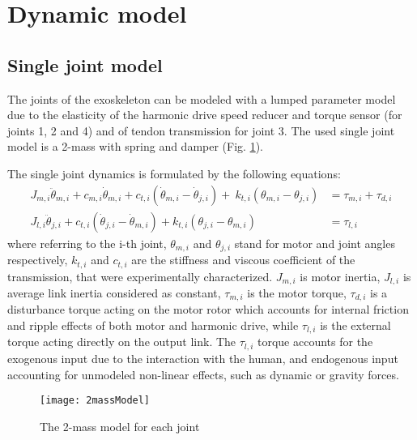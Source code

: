 \section{Dynamic model} \label{sec:dynamic_model}

\subsection{Single joint model} \label{Single joint model}
The joints of the exoskeleton can be modeled with a lumped parameter model due to the elasticity of the harmonic drive speed reducer and torque sensor (for joints 1, 2 and 4) and of tendon transmission for joint 3. The used single joint model is a 2-mass with spring and damper (Fig. \ref{fig:exos_singlejoint_model}).
\par The single joint dynamics is formulated by the following equations:
\setlength{\arraycolsep}{0.0em}
\footnotesize
\begin{align}
J_{m,i} \ddot{\theta}_{m,i}  + c_{m,i}\dot{\theta}_{m,i} + c_{t,i} (\dot{\theta}_{m,i}-\dot{\theta}_{j,i})  
{+}\:k_{t,i} ({\theta_{m,i}}-{\theta_{j,i}}) &= \tau_{m,i}+\tau_ {d,i} \nonumber	\\
\label{eqn:dinamicaLinkSingoloGiunto}
J_{l,i} \ddot{\theta}_{j,i}+c_{t,i} (\dot{\theta}_{j,i}-\dot{\theta}_{m,i})
+k_{t,i} ({\theta_{j,i}}-{\theta_{m,i}}) &= \tau_{l,i}	
\end{align}
\normalsize
\setlength{\arraycolsep}{5pt}
where referring to the i-th joint, $\theta_ {m,i}$ and $\theta_ {j,i}$ stand for motor and joint angles respectively, $k_{t,i}$ and $c_{t,i}$ are the stiffness and viscous coefficient of the transmission, that were experimentally characterized.
$J_{m,i}$ is motor inertia, $J_{l,i}$ is average link inertia considered as constant, $\tau_{m,i}$ is the motor torque, $\tau_{d,i}$ is a disturbance torque acting on the motor rotor  which accounts for internal friction and ripple effects of both motor and harmonic drive, while $\tau_{l,i}$ is the external torque acting directly on the output link. The $\tau_{l,i}$ torque accounts for the 
exogenous input due to the interaction  with the human, and endogenous input accounting for unmodeled non-linear effects, such as dynamic or gravity forces.
\begin{figure}[ht]
	\centering
	{\texttt{[image: 2massModel]}}
	\caption{The 2-mass model for each joint}
	\label{fig:exos_singlejoint_model}
\end{figure}
